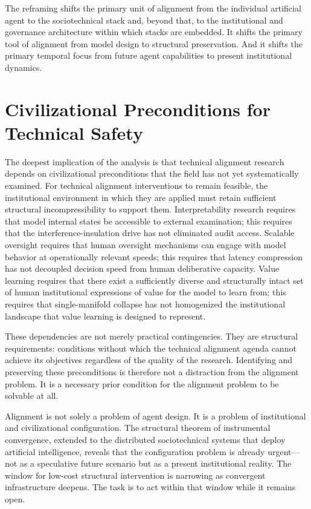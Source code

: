 \documentclass[12pt, oneside]{book}
\theoremstyle{plain}
\theoremstyle{definition}
\theoremstyle{remark}
\theoremstyle{definition}
\begin{document}
The reframing shifts the primary unit of alignment from the individual artificial
agent to the sociotechnical stack and, beyond that, to the institutional and
governance architecture within which stacks are embedded. It shifts the primary
tool of alignment from model design to structural preservation. And it shifts the
primary temporal focus from future agent capabilities to present institutional
dynamics.

\section{Civilizational Preconditions for Technical Safety}

The deepest implication of the analysis is that technical alignment research depends
on civilizational preconditions that the field has not yet systematically examined.
For technical alignment interventions to remain feasible, the institutional
environment in which they are applied must retain sufficient structural
incompressibility to support them. Interpretability research requires that model
internal states be accessible to external examination; this requires that the
interference-insulation drive has not eliminated audit access. Scalable oversight
requires that human oversight mechanisms can engage with model behavior at
operationally relevant speeds; this requires that latency compression has not
decoupled decision speed from human deliberative capacity. Value learning requires
that there exist a sufficiently diverse and structurally intact set of human
institutional expressions of value for the model to learn from; this requires that
single-manifold collapse has not homogenized the institutional landscape that value
learning is designed to represent.

These dependencies are not merely practical contingencies. They are structural
requirements: conditions without which the technical alignment agenda cannot achieve
its objectives regardless of the quality of the research. Identifying and preserving
these preconditions is therefore not a distraction from the alignment problem. It is
a necessary prior condition for the alignment problem to be solvable at all.

Alignment is not solely a problem of agent design. It is a problem of institutional
and civilizational configuration. The structural theorem of instrumental convergence,
extended to the distributed sociotechnical systems that deploy artificial intelligence,
reveals that the configuration problem is already urgent---not as a speculative future
scenario but as a present institutional reality. The window for low-cost structural
intervention is narrowing as convergent infrastructure deepens. The task is to act
within that window while it remains open.
\end{document}
